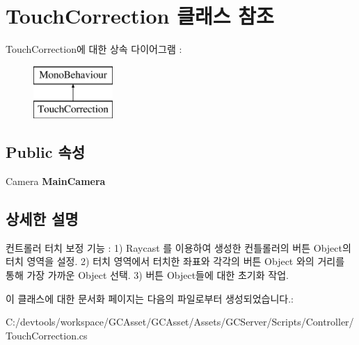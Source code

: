 \hypertarget{class_touch_correction}{}\section{Touch\+Correction 클래스 참조}
\label{class_touch_correction}
Touch\+Correction에 대한 상속 다이어그램 \+: \begin{figure}[H]
\begin{center}
\leavevmode
\includegraphics[height=2.000000cm]{class_touch_correction}
\end{center}
\end{figure}
\subsection*{Public 속성}
\begin{DoxyCompactItemize}
\item 
\hypertarget{class_touch_correction_ad2f6687a58b7e669d220199879df2bbe}{}Camera {\bfseries Main\+Camera}\label{class_touch_correction_ad2f6687a58b7e669d220199879df2bbe}

\end{DoxyCompactItemize}


\subsection{상세한 설명}
컨트롤러 터치 보정 기능 \+: 1) Raycast 를 이용하여 생성한 컨틀롤러의 버튼 Object의 터치 영역을 설정. 2) 터치 영역에서 터치한 좌표와 각각의 버튼 Object 와의 거리를 통해 가장 가까운 Object 선택. 3) 버튼 Object들에 대한 초기화 작업. 

이 클래스에 대한 문서화 페이지는 다음의 파일로부터 생성되었습니다.\+:\begin{DoxyCompactItemize}
\item 
C\+:/devtools/workspace/\+G\+C\+Asset/\+G\+C\+Asset/\+Assets/\+G\+C\+Server/\+Scripts/\+Controller/Touch\+Correction.\+cs\end{DoxyCompactItemize}
